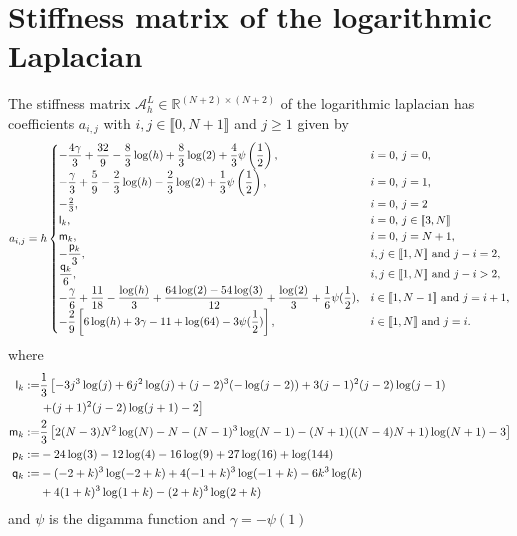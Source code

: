 \documentclass[11 pt]{article}
\newcommand\inter[1]{\llbracket #1\rrbracket}
\numberwithin{equation}{section}
\def\R{\mathbb{R}}
\begin{document}
\section{Stiffness matrix of the logarithmic Laplacian}\label{sec:s:m:log}

The stiffness matrix $\mathcal A_{h}^{L}\in{\R^{(N+2)\times(N+2)}}$ of the logarithmic laplacian has coefficients $a_{i,j}$ with $i,j\in\inter{0,N+1}$ and $j\geq 1$ given by
%
\begin{equation}\label{stiff:LogLap}
a_{i,j}= h
\begin{cases}
\displaystyle -\frac{4 \gamma }{3}+\frac{32 }{9}-\frac{8}{3}  \log (h)+\frac{8}{3}  \log
   (2)+\frac{4}{3}  \psi \left(\frac{1}{2}\right), & \textnormal{$i=0$, $j=0$,} \\ 
\displaystyle -\frac{\gamma }{3}+\frac{5}{9}-\frac{2}{3} \log (h)-\frac{2}{3}  \log
   (2)+\frac{1}{3} \psi \left(\frac{1}{2}\right), & \textnormal{$i=0$, $j=1$,} \\
   -\frac{2}{3}, 
 & \parbox[t]{.3\columnwidth}{$i=0$, $j=2$}\\
 \mathsf{l}_k, 
 & \parbox[t]{.3\columnwidth}{$i=0$, $j\in\inter{3,N}$}\\
 \mathsf{m}_k, &  \parbox[t]{.3\columnwidth}{$i=0$, $j=N+1$,}\\
\displaystyle -\frac{\mathsf p_k}{3}, & \textnormal{$i,j\in\inter{1,N}$ and $j-i=2$,} \\
\displaystyle \frac{\mathsf q_k}{6}, & \textnormal{$i,j\in\inter{1,N}$ and $j-i> 2$,} \\
\displaystyle -\frac{\gamma}{6} + \frac{11}{18} - \frac{\log(h)}{3}  + \frac{64\log(2) - 54\log(3)}{12} + \frac{\log(2)}{3}  + \frac{1}{6} \psi(\frac 12), & \textnormal{$i\in\inter{1,N-1}$ and $j=i+1$,} \\
\displaystyle -\frac{2}{9}\left[6\log(h) + 3\gamma - 11 + \log(64) - 3\psi(\frac12)\right], & \textnormal{$i\in\inter{1,N}$ and $j=i$.}
\end{cases}
\end{equation}
%
where 
%
\begin{align} \notag
\mathsf{l}_k:= & \frac{1}{3}  \left[-3 j^3 \log (j)+6 j^2 \log (j)+(j-2)^3 (-\log (j-2))+3
   (j-1)^2 (j-2) \log (j-1) \right. \\
   &\left. +(j+1)^2 (j-2) \log (j+1)-2\right] \\
   \mathsf{m}_k:= & \frac{2}{3}\left[2 (N-3) N^2 \log (N)-N-(N-1)^3 \log (N-1)-(N+1) ((N-4) N+1) \log (N+1)-3\right] \\
\mathsf{p}_k:=&  -24\log(3) - 12\log(4) - 16\log(9) + 27\log(16) + \log(144) \\ \notag
\mathsf{q}_k:=&-(-2 + k)^3\log(-2 + k) + 4(-1 + k)^3\log(-1 + k) - 6 k^3 \log(k)  \\
&+4(1 + k)^3\log(1 + k) - (2 + k)^3\log(2 + k)
\end{align}
and $\psi$ is the digamma function and $\gamma=-\psi(1)$
\end{document}
